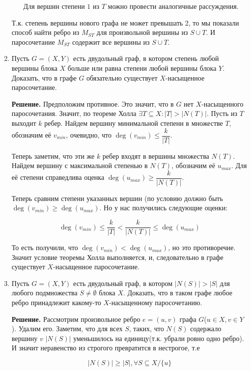 \documentclass[fleqn]{article}
\begin{document}
\begin{enumerate}
\begin{itemize}
		Для вершин степени $1$ из $T$ можно провести аналогичные рассуждения.
	 \end{itemize} 
	 
	 Т.к. степень вершины нового графа не может превышать 2, то мы показали способ найти ребро из $M_{ST}$ для произвольной вершины из $S\cup T$. И паросочетание $M_{ST}$ содержит все вершины из  $S\cup T$.
	
	\item Пусть $G = (X, Y)$ есть двудольный граф, в котором степень любой вершины блока $X$ больше или равна степени любой вершины блока $Y$. Доказать, что в графе $G$ обязательно существует $X$-насыщенное паросочетание.
	
	\textbf{Решение.} Предположим противное. Это значит, что в $G$ нет $X$-насыщенного паросочетания. Значит, по теореме Холла $\exists T \subseteq X : |T| > |N(T)|$. Пусть из $T$ выходит $k$ ребер. Найдем вершину минимальной степени в множестве $T$, обозначим её $v_{min}$, очевидно, что $\deg(v_{min}) \leqslant \dfrac{k}{|T|}$.
	
	Теперь заметим, что эти же $k$ ребер входят в вершины множества $N(T)$. Найдем вершину с максимальной степенью в $N(T)$, обозначим её $u_{max}$. Для её степени справедлива оценка $\deg(u_{max}) \geqslant \dfrac{k}{|N(T)|}$.
	
	Теперь сравним степени указанных вершин (по условию должно быть $\deg(v_{min}) \geqslant \deg(u_{max})$. Но у нас получились следующие оценки:
	
	$$\deg(v_{min}) \leqslant \frac{k}{|T|} < \frac{k}{|N(T)|} \leqslant \deg(u_{max})$$
	
	То есть получили, что $\deg(v_{min}) < \deg(u_{max})$, но это противоречие. Значит условие теоремы Холла выполняется, и, следовательно в графе существует $X$-насыщенное паросочетание.
	
	\item Пусть $G = (X, Y)$ есть двудольный граф, в котором $|N(S)| > |S|$ для любого подмножества $S \neq \emptyset$	блока $X$. Доказать, что в таком графе любое ребро принадлежит какому-то $X$-насыщенному паросочетанию.
	
	\textbf{Решение.} Рассмотрим произвольное ребро $e = (u, v)$ графа $G$($u\in X, v \in Y$). Удалим его. Заметим, что для всех $S$, таких, что $N(S)$ содержало вершину $v$ $|N(S)|$ уменьшилось на единицу(т.к. убрали ровно одно ребро). И значит неравенство из строгого превратится в нестрогое, т.е 
	
	$$|N(S)| \geqslant |S|, \forall S \subseteq X/\{u\}$$
	

\end{enumerate}
\end{document}
